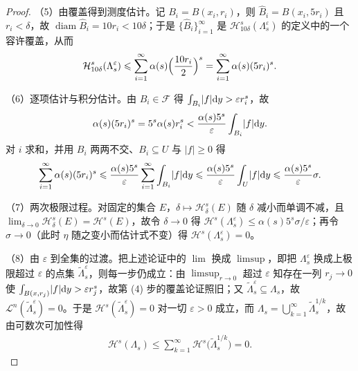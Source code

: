 \documentclass[../../main.tex]{subfiles}%
\begin{document}
\begin{proof}
（5）由覆盖得到测度估计。记 $B_i=B(x_i,r_i)$，则 $\hat B_i=B(x_i,5r_i)$ 且 $r_i<\delta$，故 $\operatorname{diam}\hat B_i=10r_i<10\delta$；于是 $\{\hat B_i\}_{i=1}^{\infty}$ 是 $\mathcal{H}^s_{10\delta}(\Lambda_s^\varepsilon)$ 的定义中的一个容许覆盖，从而
\begin{align*}
\mathcal{H}^s_{10\delta}(\Lambda_s^\varepsilon)\leqslant\sum_{i=1}^{\infty}\alpha(s)\Bigl(\frac{10r_i}{2}\Bigr)^s=\sum_{i=1}^{\infty}\alpha(s)(5r_i)^s .
\end{align*}

（6）逐项估计与积分估计。由 $B_i\in\mathcal{F}$ 得 $\int_{B_i}\lvert f\rvert\mathrm{d} y>\varepsilon r_i^s$，故
\begin{align*}
\alpha(s)(5r_i)^s=5^s\alpha(s)r_i^s<\frac{\alpha(s)5^s}{\varepsilon}\int_{B_i}\lvert f\rvert\mathrm{d} y .
\end{align*}
对 $i$ 求和，并用 $B_i$ 两两不交、$B_i\subseteq U$ 与 $\lvert f\rvert\geqslant0$ 得
\begin{align*}
\sum_{i=1}^{\infty}\alpha(s)(5r_i)^s
\leqslant\frac{\alpha(s)5^s}{\varepsilon}\sum_{i=1}^{\infty}\int_{B_i}\lvert f\rvert\mathrm{d} y
\leqslant\frac{\alpha(s)5^s}{\varepsilon}\int_U\lvert f\rvert\mathrm{d} y
\leqslant\frac{\alpha(s)5^s}{\varepsilon}\sigma .
\end{align*}

（7）两次极限过程。对固定的集合 $E$，$\delta\mapsto\mathcal{H}^s_\delta(E)$ 随 $\delta$ 减小而单调不减，且 $\lim_{\delta\to0}\mathcal{H}^s_\delta(E)=\mathcal{H}^s(E)$，故令 $\delta\to0$ 得 $\mathcal{H}^s(\Lambda_s^\varepsilon)\leqslant\alpha(s)5^s\sigma/\varepsilon$；再令 $\sigma\to0$（此时 $\eta$ 随之变小而估计式不变）得 $\mathcal{H}^s(\Lambda_s^\varepsilon)=0$。

（8）由 $\varepsilon$ 到全集的过渡。把上述论证中的 $\lim$ 换成 $\limsup$，即把 $\Lambda_s^\varepsilon$ 换成上极限超过 $\varepsilon$ 的点集 $\widetilde\Lambda_s^\varepsilon$，则每一步仍成立：由 $\limsup_{r\to0}$ 超过 $\varepsilon$ 知存在一列 $r_j\to0$ 使 $\int_{B(x,r_j)}\lvert f\rvert\mathrm{d} y>\varepsilon r_j^s$，故第 (4) 步的覆盖论证照旧；又 $\widetilde\Lambda_s^\varepsilon\subseteq\Lambda_s$，故 $\mathcal{L}^n(\widetilde\Lambda_s^\varepsilon)=0$。于是 $\mathcal{H}^s(\widetilde\Lambda_s^\varepsilon)=0$ 对一切 $\varepsilon>0$ 成立，而 $\Lambda_s=\bigcup_{k=1}^{\infty}\widetilde\Lambda_s^{1/k}$，故由可数次可加性得
\begin{align*}
\mathcal{H}^s(\Lambda_s)\leqslant\sum_{k=1}^{\infty}\mathcal{H}^s\bigl(\widetilde\Lambda_s^{1/k}\bigr)=0 .
\end{align*}
\end{proof}
\end{document}

